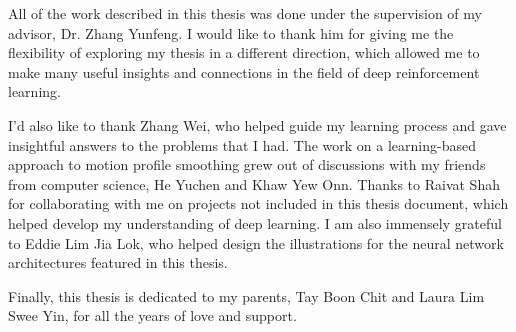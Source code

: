 \begin{acknowledgments}
All of the work described in this thesis was done under the supervision of my advisor, Dr. Zhang Yunfeng. I would like to thank him for giving me the flexibility of exploring my thesis in a different direction, which allowed me to make many useful insights and connections in the field of deep reinforcement learning.

I'd also like to thank Zhang Wei, who helped guide my learning process and gave insightful answers to the problems that I had. The work on a learning-based approach to motion profile smoothing grew out of discussions with my friends from computer science, He Yuchen and Khaw Yew Onn. Thanks to Raivat Shah for collaborating with me on projects not included in this thesis document, which helped develop my understanding of deep learning. I am also immensely grateful to Eddie Lim Jia Lok, who helped design the illustrations for the neural network architectures featured in this thesis.

Finally, this thesis is dedicated to my parents, Tay Boon Chit and Laura Lim Swee Yin, for all the years of love and support.
\end{acknowledgments}
